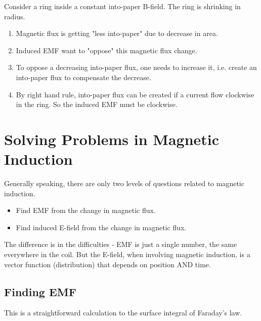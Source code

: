 \documentclass[class=article, crop=false, 12pt]{standalone}
\begin{document}
\begin{example}
    Consider a ring inside a constant into-paper B-field.
    The ring is shrinking in radius.
    \begin{enumerate}
        \item Magnetic flux is getting "less into-paper" due to
        decrease in area.
        \item Induced EMF want to "oppose" this magnetic flux change.
        \item To oppose a decreasing into-paper flux, one needs to increase it,
        i.e. create an into-paper flux to compensate the decrease.
        \item By right hand rule, into-paper flux can be created
        if a current flow clockwise in the ring.
        So the induced EMF must be clockwise.
        
    \end{enumerate}


\end{example}



\linesep
\section{Solving Problems in Magnetic Induction}

Generally speaking, there are only two levels of questions related to magnetic induction.
\begin{itemize}
    \item Find EMF from the change in magnetic flux.
    \item Find induced E-field from the change in magnetic flux. 
\end{itemize}

The difference is in the difficulties - 
EMF is just a single number, the same everywhere in the coil.
But the E-field, when involving magnetic induction, 
is a vector function (distribution) that depends on position AND time.

\subsection{Finding EMF}

This is a straightforward calculation to the surface integral of Faraday's law.
\end{document}
